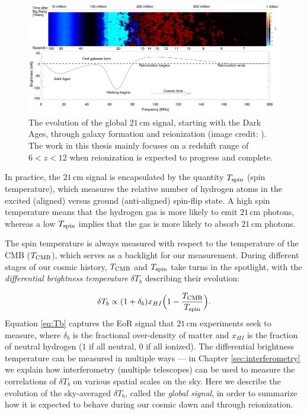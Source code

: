 \begin{figure}
	\centering
	\includegraphics[width=\columnwidth]{plots/timeline_global.pdf}
	\caption{The evolution of the global $21$\,cm signal, starting with the Dark Ages, through galaxy formation and reionization (image credit: \citet{pritchard_loeb2012}). The work in this thesis mainly focuses on a redshift range of $6 < z < 12$ when reionization is expected to progress and complete.}
	\label{fig:timeline_global}
\end{figure}

In practice, the $21$\,cm signal is encapsulated by the quantity $T_{\rm spin}$ (spin temperature), which measures the relative number of hydrogen atoms in the excited (aligned) versus ground (anti-aligned) spin-flip state. A high spin temperature means that the hydrogen gas is more likely to emit $21$\,cm photons, whereas a low $T_{\rm spin}$ implies that the gas is more likely to absorb $21$\,cm photons. 

The spin temperature is always measured with respect to the temperature of the CMB ($T_{\rm CMB}$), which serves as a backlight for our measurement. During different stages of our cosmic history, $T_{\rm CMB}$ and $T_{\rm spin}$ take turns in the spotlight, with the \textit{differential brightness temperature} $\delta T_{b}$ describing their evolution:

\begin{equation}
\label{eq:Tb}
\delta T_{b} \propto (1+\delta_{b})x_{HI}\Big(1-\frac{T_{\rm CMB}}{T_{\rm spin}}\Big).
\end{equation}
Equation \eqref{eq:Tb} captures the EoR signal that $21$\,cm experiments seek to measure, where $\delta_{b}$ is the fractional over-density of matter and $x_{HI}$ is the fraction of neutral hydrogen ($1$ if all neutral, $0$ if all ionized). The differential brightness temperature can be measured in multiple ways --- in Chapter \ref{sec:interferometry} we explain how interferometry (multiple telescopes) can be used to measure the correlations of $\delta T_{b}$ on various spatial scales on the sky. Here we describe the evolution of the sky-averaged $\delta T_{b}$, called the \textit{global signal}, in order to summarize how it is expected to behave during our cosmic dawn and through reionization.

